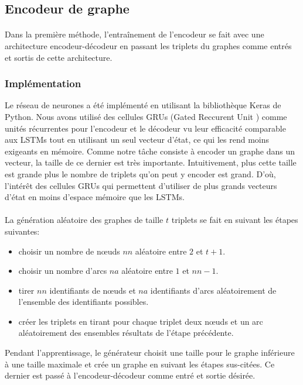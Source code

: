 \subsection{Encodeur de graphe}
\paragraph{}Dans la première méthode, l'entraînement de l'encodeur se fait avec une architecture encodeur-décodeur en passant les triplets du graphes comme entrés et sortis de cette architecture.
\subsubsection{Implémentation}
\par Le réseau de neurones a été implémenté en utilisant la bibliothèque Keras de Python. Nous avons utilisé des cellules GRUs (Gated Reccurent Unit \cite{Cho2014}) comme unités récurrentes pour l'encodeur et le décodeur vu leur efficacité comparable aux LSTMs tout en utilisant un seul vecteur d'état, ce qui les rend moins exigeants en mémoire. Comme notre tâche consiste à encoder un graphe dans un vecteur, la taille de ce dernier est très importante. Intuitivement, plus cette taille est grande plus le nombre de triplets qu'on peut y encoder est grand. D'où, l'intérêt des cellules GRUs qui permettent d'utiliser de plus grands vecteurs d'état en moins d'espace mémoire que les LSTMs.
\paragraph{}La génération aléatoire des graphes de taille $t$ triplets se fait en suivant les étapes suivantes:
\begin{itemize}
	\item choisir un nombre de n\oe{}uds $nn$ aléatoire entre $2$ et $t+1$.
	\item choisir un nombre d'arcs $na$ aléatoire entre $1$ et $nn-1$.
	\item tirer $nn$ identifiants de n\oe{}uds et $na$ identifiants d'arcs aléatoirement de l'ensemble des identifiants possibles.
	\item créer les triplets en tirant pour chaque triplet deux n\oe{}uds et un arc aléatoirement des ensembles résultats de l'étape précédente. 
\end{itemize}
\par Pendant l'apprentissage, le générateur choisit une taille pour le graphe inférieure à une taille maximale et crée un graphe en suivant les étapes sus-citées. Ce dernier est passé à l'encodeur-décodeur comme entré et sortie désirée.

